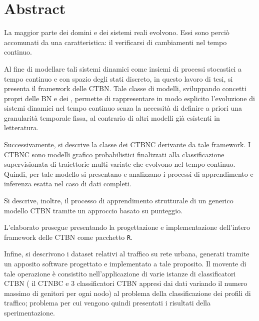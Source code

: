 
\cleardoublepage
{}
{}
\chapter*{Abstract}
La maggior parte dei domini e dei sistemi reali evolvono. Essi sono perciò accomunati da una caratteristica: il verificarsi di cambiamenti nel tempo continuo.

Al fine di modellare tali sistemi dinamici come insiemi di processi stocastici a tempo continuo e con spazio degli stati discreto, in questo lavoro di tesi, si presenta il framework delle \acf{CTBN}. Tale classe di modelli, sviluppando concetti propri delle \acf{BN} e dei \mprocess{}, permette di rappresentare in modo esplicito l'evoluzione di sistemi dinamici nel tempo continuo senza la necessità di definire a priori una granularità temporale fissa, al contrario di altri modelli già esistenti in letteratura.

Successivamente, si descrive la classe dei \acf{CTBNC} derivante da tale framework. I \acs{CTBNC} sono modelli grafico probabilistici finalizzati alla classificazione supervisionata di traiettorie multi-variate che evolvono nel tempo continuo. Quindi, per tale modello si presentano e analizzano i processi di apprendimento e inferenza esatta nel caso di dati completi.

Si descrive, inoltre, il processo di apprendimento strutturale di un generico modello \acs{CTBN} tramite un approccio basato su punteggio.

L'elaborato prosegue presentando la progettazione e implementazione dell'intero framework delle \acs{CTBN} come pacchetto \lstinline$R$.

Infine, si descrivono i dataset relativi al traffico su rete urbana, generati tramite un apposito software progettato e implementato a tale proposito. Il movente di tale operazione è consistito nell'applicazione di varie istanze di classificatori \acs{CTBN} (\ie{} il \acf{CTNBC} e $3$ classificatori \acs{CTBN} appresi dai dati variando il numero massimo di genitori per ogni nodo) al problema della classificazione dei profili di traffico; problema per cui vengono quindi presentati i risultati della sperimentazione.

\vfill

